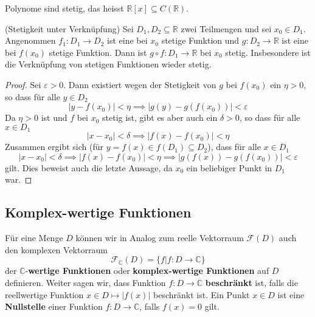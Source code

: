 \documentclass[../Analysis1_script.tex]{subfiles}
\begin{document}
\begin{corollary}
	Polynome sind stetig, das heisst $\mathbb{R}[x] \subseteq C(\mathbb{R})$.
\end{corollary}

\begin{proposition}{(Stetigkeit unter Verknüpfung)}
	Sei $D_1, D_2 \subseteq \mathbb{R}$ zwei Teilmengen und sei $x_0 \in D_1$. Angenommen $f_1: D_1 \to D_2$ ist eine bei $x_0$ stetige Funktion und $g: D_2 \to \mathbb{R}$ ist eine bei $f(x_0)$ stetige Funktion. Dann ist $g \circ f: D_1 \to \mathbb{R}$ bei $x_0$ stetig. Insbesondere ist die Verknüpfung von stetigen Funktionen wieder stetig.
\end{proposition}

\begin{proof}
	Sei $\varepsilon > 0$. Dann existiert wegen der Stetigkeit von $g$ bei $f(x_0)$ ein $\eta > 0$, so dass für alle $y \in D_2$
	\[|y - f(x_0)| < \eta \implies |g(y) - g(f(x_0))| < \varepsilon\]
	Da $\eta > 0$ ist und $f$ bei $x_0$ stetig ist, gibt es aber auch ein $\delta > 0$, so dass für alle $x \in D_1$
	\[|x - x_0| < \delta \implies |f(x) - f(x_0)| < \eta\]
	Zusammen ergibt sich (für $y = f(x) \in f(D_1) \subseteq D_2$), dass für alle $x \in D_1$
	\[|x - x_0| < \delta \implies |f(x) - f(x_0)| < \eta \implies |g(f(x)) - g(f(x_0))| < \varepsilon\]
	gilt. Dies beweist auch die letzte Aussage, da $x_0$ ein beliebiger Punkt in $D_1$ war.
\end{proof}
\subsection{Komplex-wertige Funktionen}

Für eine Menge $D$ können wir in Analog zum reelle Vektorraum $\mathcal{F}(D)$ auch den komplexen Vektorraum
\[\mathcal{F}_{\mathbb{C}}(D) = \{f | f : D \to \mathbb{C} \}\]
der $\mathbb{C}$-\textbf{wertige Funktionen} oder \textbf{komplex-wertige Funktionen} auf $D$ definieren. Weiter sagen wir, dass Funktion $f : D \to \mathbb{C}$ \textbf{beschränkt} ist, falls die reellwertige Funktion $x \in D \mapsto |f(x)|$ beschränkt ist. Ein Punkt $x \in D$ ist eine \textbf{Nullstelle} einer Funktion $f : D \to \mathbb{C}$, falls $f(x) = 0$ gilt.
\end{document}
